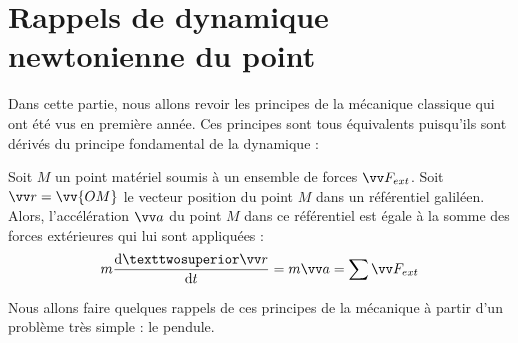 \documentclass[11pt,fleqn]{book} %
\newcommand{\dd}{\mathrm{d}}
\begin{document}
\section{Rappels de dynamique newtonienne du point}

Dans cette partie, nous allons revoir les principes de la mécanique classique qui ont été vus en première année. Ces principes sont tous équivalents puisqu'ils sont dérivés du principe fondamental de la dynamique :

\begin{theorem}
    Soit $M$ un point matériel soumis à un ensemble de forces $\vv F_{ext}$. Soit $\vv r = \vv{OM}$ le vecteur position du point $M$ dans un référentiel galiléen. Alors, l'accélération $\vv a$ du point $M$ dans ce référentiel est égale à la somme des forces extérieures qui lui sont appliquées :
    \begin{equation}
        m \frac{\dd² \vv r}{\dd t} = m \vv a = \sum \vv F_{ext}
    \end{equation}
\end{theorem}

Nous allons faire quelques rappels de ces principes de la mécanique à partir d'un problème très simple : le pendule.
\end{document}
